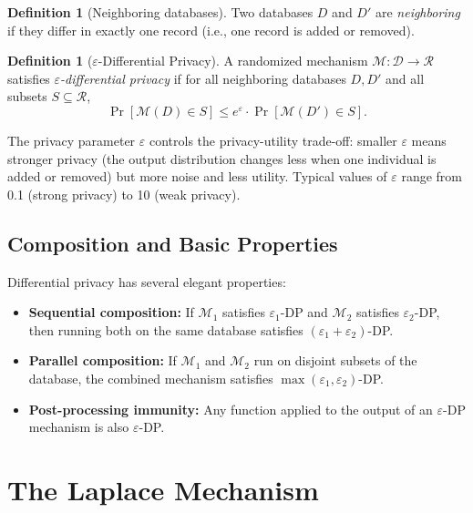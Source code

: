 \documentclass[twoside,12pt]{book}
\theoremstyle{plain}
\theoremstyle{definition}
\newtheorem{definition}[theorem]{Definition}
\theoremstyle{remark}
\begin{document}
\begin{definition}[Neighboring databases]
Two databases $D$ and $D'$ are \emph{neighboring} if they differ in exactly one record (i.e., one record is added or removed).
\end{definition}

\begin{definition}[$\varepsilon$-Differential Privacy]
A randomized mechanism $\mathcal{M} : \mathcal{D} \to \mathcal{R}$ satisfies \emph{$\varepsilon$-differential privacy} if for all neighboring databases $D, D'$ and all subsets $S \subseteq \mathcal{R}$,
\[
\Pr[\mathcal{M}(D) \in S] \leq e^{\varepsilon} \cdot \Pr[\mathcal{M}(D') \in S].
\]
\end{definition}

The privacy parameter $\varepsilon$ controls the privacy-utility trade-off: smaller $\varepsilon$ means stronger privacy (the output distribution changes less when one individual is added or removed) but more noise and less utility. Typical values of $\varepsilon$ range from 0.1 (strong privacy) to 10 (weak privacy).

\subsection{Composition and Basic Properties}

Differential privacy has several elegant properties:

\begin{itemize}[nosep]
  \item \textbf{Sequential composition:} If $\mathcal{M}_1$ satisfies $\varepsilon_1$-DP and $\mathcal{M}_2$ satisfies $\varepsilon_2$-DP, then running both on the same database satisfies $(\varepsilon_1 + \varepsilon_2)$-DP.
  \item \textbf{Parallel composition:} If $\mathcal{M}_1$ and $\mathcal{M}_2$ run on disjoint subsets of the database, the combined mechanism satisfies $\max(\varepsilon_1, \varepsilon_2)$-DP.
  \item \textbf{Post-processing immunity:} Any function applied to the output of an $\varepsilon$-DP mechanism is also $\varepsilon$-DP.
\end{itemize}

\section{The Laplace Mechanism}
\label{sec:laplace-mechanism}
\end{document}

